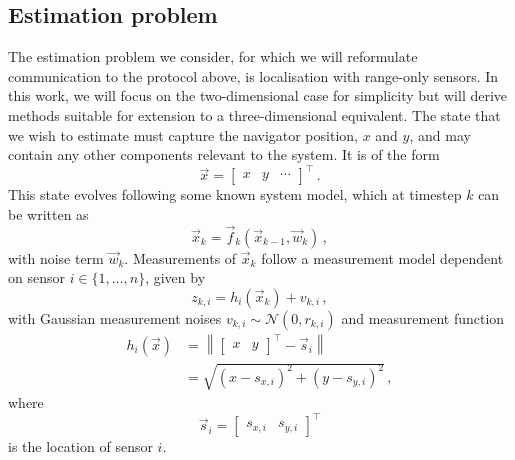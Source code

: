 \documentclass[10pt,letterpaper,oneside,twocolumn,journal]{IEEEtran}
\theoremstyle{definition}
\theoremstyle{definition}
\theoremstyle{remark}
\begin{document}
\subsection{Estimation problem} \label{subsec:est_problem}
The estimation problem we consider, for which we will reformulate communication to the protocol above, is localisation with range-only sensors. In this work, we will focus on the two-dimensional case for simplicity but will derive methods suitable for extension to a three-dimensional equivalent. The state that we wish to estimate must capture the navigator position, $x$ and $y$, and may contain any other components relevant to the system. It is of the form
\begin{equation}
    \vec{x} = 
    \begin{bmatrix}
        x & y & \cdots
    \end{bmatrix}^\top\,. \label{eqn:state_definition}
\end{equation}
This state evolves following some known system model, which at timestep $k$ can be written as
\begin{equation}
    \vec{x}_k = \vec{f}_k(\vec{x}_{k-1}, \vec{w}_k)\,, \label{eqn:system_model}
\end{equation}
with noise term $\vec{w}_k$. Measurements of $\vec{x}_k$ follow a measurement model dependent on sensor $i\in\{1,\dots,n\}$, given by 
\begin{equation}
    z_{k,i} = h_i(\vec{x}_k)+v_{k,i}\,, \label{eqn:measurement_model}
\end{equation}
with Gaussian measurement noises $v_{k,i} \sim \mathcal{N}(0,r_{k,i})$ and measurement function
\begin{equation}
    \begin{split}
        h_i(\vec{x}) &= \left\lVert
        \begin{bmatrix}
            x & y
        \end{bmatrix}^\top
        - \vec{s}_{i}\right\rVert \\
        &= \sqrt{(x-s_{x,i})^2 + (y-s_{y,i})^2}\,,
    \end{split}
\end{equation}
where
\begin{equation}
    \vec{s}_i = 
    \begin{bmatrix}
        s_{x,i} & s_{y,i}
    \end{bmatrix}^\top
\end{equation} 
is the location of sensor $i$.
\end{document}
